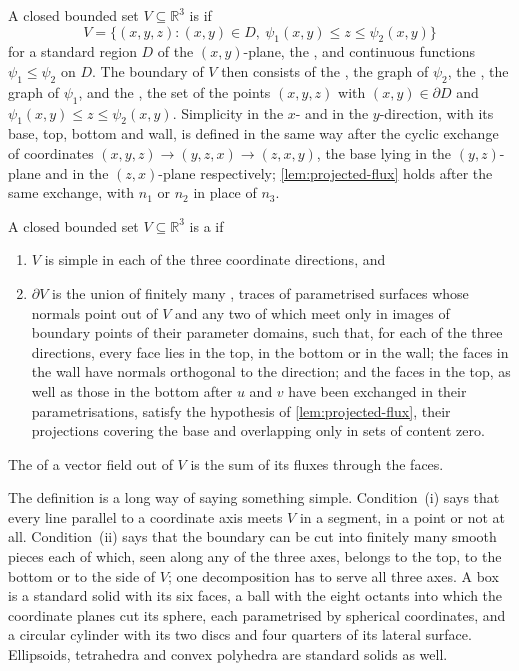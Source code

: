 A closed bounded set $V\subseteq\mathbb R^3$ is  if
\[
V=\bigl\{(x,y,z): (x,y)\in D,\ \psi_1(x,y)\le z\le\psi_2(x,y)\bigr\}
\]
for a standard region $D$ of the $(x,y)$-plane, the , and continuous functions $\psi_1\le\psi_2$ on $D$. The boundary of $V$ then consists of the , the graph of $\psi_2$, the , the graph of $\psi_1$, and the , the set of the points $(x,y,z)$ with $(x,y)\in\partial D$ and $\psi_1(x,y)\le z\le\psi_2(x,y)$. Simplicity in the $x$- and in the $y$-direction, with its base, top, bottom and wall, is defined in the same way after the cyclic exchange of coordinates $(x,y,z)\to(y,z,x)\to(z,x,y)$, the base lying in the $(y,z)$-plane and in the $(z,x)$-plane respectively; \cref{lem:projected-flux} holds after the same exchange, with $n_1$ or $n_2$ in place of $n_3$.

\begin{definition}
\label{def:standard-solid}
A closed bounded set $V\subseteq\mathbb R^3$ is a  if
\begin{enumerate}
\item $V$ is simple in each of the three coordinate directions, and
\item $\partial V$ is the union of finitely many , traces of parametrised surfaces whose normals point out of $V$ and any two of which meet only in images of boundary points of their parameter domains, such that, for each of the three directions, every face lies in the top, in the bottom or in the wall; the faces in the wall have normals orthogonal to the direction; and the faces in the top, as well as those in the bottom after $u$ and $v$ have been exchanged in their parametrisations, satisfy the hypothesis of \cref{lem:projected-flux}, their projections covering the base and overlapping only in sets of content zero.
\end{enumerate}
The  of a vector field out of $V$ is the sum of its fluxes through the faces.
\end{definition}

The definition is a long way of saying something simple. Condition~(i) says that every line parallel to a coordinate axis meets $V$ in a segment, in a point or not at all. Condition~(ii) says that the boundary can be cut into finitely many smooth pieces each of which, seen along any of the three axes, belongs to the top, to the bottom or to the side of $V$; one decomposition has to serve all three axes. A box is a standard solid with its six faces, a ball with the eight octants into which the coordinate planes cut its sphere, each parametrised by spherical coordinates, and a circular cylinder with its two discs and four quarters of its lateral surface. Ellipsoids, tetrahedra and convex polyhedra are standard solids as well.

